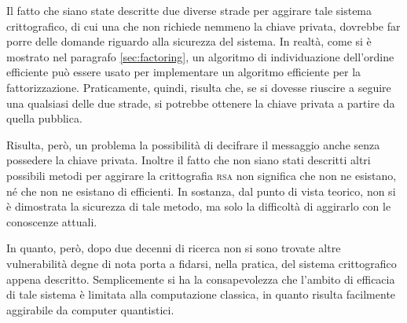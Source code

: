 Il fatto che siano state descritte due diverse strade per aggirare tale sistema crittografico, di cui una che non richiede nemmeno la chiave privata, dovrebbe far porre delle domande riguardo alla sicurezza del sistema.
In realtà, come si è mostrato nel paragrafo \ref{sec:factoring}, un algoritmo di individuazione dell'ordine efficiente può essere usato per implementare un algoritmo efficiente per la fattorizzazione.
Praticamente, quindi, risulta che, se si dovesse riuscire a seguire una qualsiasi delle due strade, si potrebbe ottenere la chiave privata a partire da quella pubblica.

Risulta, però, un problema la possibilità di decifrare il messaggio anche senza possedere la chiave privata.
Inoltre il fatto che non siano stati descritti altri possibili metodi per aggirare la crittografia \textsc{rsa} non significa che non ne esistano, né che non ne esistano di efficienti.
In sostanza, dal punto di vista teorico, non si è dimostrata la sicurezza di tale metodo, ma solo la difficoltà di aggirarlo con le conoscenze attuali.

In quanto, però, dopo due decenni di ricerca non si sono trovate altre vulnerabilità degne di nota porta a fidarsi, nella pratica, del sistema crittografico appena descritto.
Semplicemente si ha la consapevolezza che l'ambito di efficacia di tale sistema è limitata alla computazione classica, in quanto risulta facilmente aggirabile da computer quantistici.
